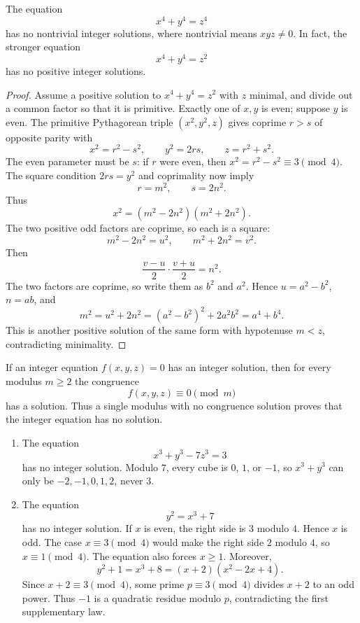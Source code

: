 \begin{thm}
The equation
\[
 x^4+y^4=z^4
\]
has no nontrivial integer solutions, where nontrivial means $xyz\ne0$.  In fact, the stronger equation
\[
 x^4+y^4=z^2
\]
has no positive integer solutions.
\end{thm}
\begin{proof}
Assume a positive solution to $x^4+y^4=z^2$ with $z$ minimal, and divide out a common factor so that it is primitive.  Exactly one of $x,y$ is even; suppose $y$ is even.  The primitive Pythagorean triple $(x^2,y^2,z)$ gives coprime $r>s$ of opposite parity with
\[
 x^2=r^2-s^2,
 \qquad
 y^2=2rs,
 \qquad
 z=r^2+s^2.
\]
The even parameter must be $s$: if $r$ were even, then $x^2=r^2-s^2\equiv3\pmod4$.  The square condition $2rs=y^2$ and coprimality now imply
\[
 r=m^2,
 \qquad
 s=2n^2.
\]
Thus
\[
 x^2=(m^2-2n^2)(m^2+2n^2).
\]
The two positive odd factors are coprime, so each is a square:
\[
 m^2-2n^2=u^2,
 \qquad
 m^2+2n^2=v^2.
\]
Then
\[
 \frac{v-u}{2}\cdot\frac{v+u}{2}=n^2.
\]
The two factors are coprime, so write them as $b^2$ and $a^2$.  Hence
$u=a^2-b^2$, $n=ab$, and
\[
 m^2=u^2+2n^2=(a^2-b^2)^2+2a^2b^2=a^4+b^4.
\]
This is another positive solution of the same form with hypotenuse $m<z$, contradicting minimality.
\end{proof}

\begin{thm}
If an integer equation $f(x,y,z)=0$ has an integer solution, then for every modulus $m\ge2$ the congruence
\[
 f(x,y,z)\equiv0\pmod m
\]
has a solution.  Thus a single modulus with no congruence solution proves that the integer equation has no solution.
\end{thm}

\begin{app}
\begin{enumerate}[label=(\alph*)]
\item The equation
\[
 x^3+y^3-7z^3=3
\]
has no integer solution.  Modulo $7$, every cube is $0$, $1$, or $-1$, so $x^3+y^3$ can only be $-2,-1,0,1,2$, never $3$.

\item The equation
\[
 y^2=x^3+7
\]
has no integer solution.  If $x$ is even, the right side is $3$ modulo $4$.  Hence $x$ is odd.  The case $x\equiv3\pmod4$ would make the right side $2$ modulo $4$, so $x\equiv1\pmod4$.  The equation also forces $x\ge1$.  Moreover,
\[
 y^2+1=x^3+8=(x+2)(x^2-2x+4).
\]
Since $x+2\equiv3\pmod4$, some prime $p\equiv3\pmod4$ divides $x+2$ to an odd power.  Thus $-1$ is a quadratic residue modulo $p$, contradicting the first supplementary law.
\end{enumerate}
\end{app}
